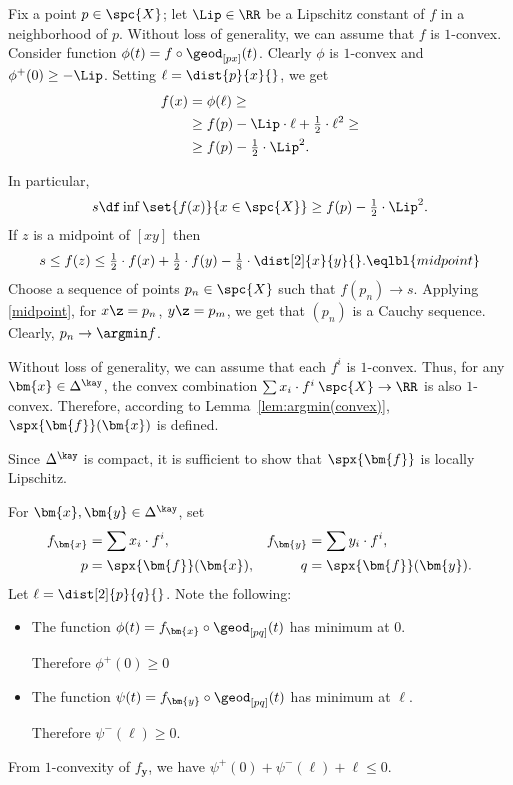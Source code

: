 Fix a point $p\in  \spc{X}$; 
let $\Lip\in\RR$ be a Lipschitz constant of $f$ in a neighborhood of $p$.
Without loss of generality, we can assume that $f$ is $1$-convex.
Consider function $\phi(t)=f\circ\geod_{[px]}(t)$.
Clearly $\phi$ is $1$-convex and $\phi^+(0)\ge -\Lip$.
Setting $\ell=\dist{p}{x}{}$, we get 
\begin{align*}
f(x)
&=
\phi(\ell)
\ge
\\
&\ge
f(p)-\Lip\cdot\ell+\tfrac{1}{2}\cdot\ell^2
\ge
\\
&\ge f(p)-\tfrac{1}{2}\cdot{\Lip^2}.
\end{align*}

In particular,
$$s
\df
\inf\set{f(x)}{x\in \spc{X}}
\ge
f(p)-\tfrac{1}{2}\cdot{\Lip^2}.$$
If $z$ is a midpoint of $[x y]$ then  
$$s\le f(z)
\le
\tfrac{1}{2}\cdot f(x)+\tfrac{1}{2}\cdot f(y)-\tfrac{1}{8}\cdot\dist[2]{x}{y}{}.
\eqlbl{midpoint}$$
Choose a sequence of points $p_n\in \spc{X}$  such that $f(p_n)\to s$.
Applying \ref{midpoint}, for $x\z=p_n$, $y\z=p_m$, we get that $(p_n)$ is a Cauchy sequence. 
Clearly, $p_n\to \argmin f$.
\qeds


 

Without loss of generality, we can assume that each $f^i$ is $1$-convex.
Thus, for any $\bm{x}\in\Delta^\kay$, 
the convex combination $\sum x_i\cdot f^i\:\spc{X}\to\RR$ is also $1$-convex.
Therefore, according to Lemma~\ref{lem:argmin(convex)}, $\spx{\bm{f}}(\bm{x})$ is defined.



Since $\Delta^\kay$ is compact, it is sufficient to show that $\spx{\bm{f}}$ is locally Lipschitz.

For $\bm{x},\bm{y}\in\Delta^\kay$,
set 
\begin{align*}
f_{\bm{x}}
&=\sum x_i\cdot f^i,
&
f_{\bm{y}}
&=\sum y_i\cdot f^i,
\\
p
&=\spx{\bm{f}}(\bm{x}),
&
q
&=\spx{\bm{f}}(\bm{y}).
\end{align*}
Let $\ell=\dist[2]{p}{q}{}$.
Note the following:
\begin{itemize}
\item The function $\phi(t)=f_{\bm{x}}\circ\geod_{[p q]}(t)$ has minimum at $0$. 

Therefore $\phi^+(0)\ge 0$
\item The function $\psi(t)=f_{\bm{y}}\circ\geod_{[p q]}(t)$ has minimum at $\ell$. 

Therefore $\psi^-(\ell)\ge 0$.
\end{itemize}
From $1$-convexity of $f_{\bm{y}}$, we have
$\psi^+(0)+\psi^-(\ell)+\ell\le0$.

